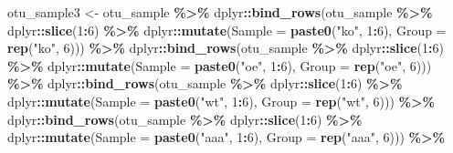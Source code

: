 \documentclass[
]{book}
\newenvironment{Shaded}{\begin{snugshade}}{\end{snugshade}}
\newcommand{\AttributeTok}[1]{\textcolor[rgb]{0.13,0.29,0.53}{#1}}
\newcommand{\DecValTok}[1]{\textcolor[rgb]{0.00,0.00,0.81}{#1}}
\newcommand{\FunctionTok}[1]{\textcolor[rgb]{0.13,0.29,0.53}{\textbf{#1}}}
\newcommand{\NormalTok}[1]{#1}
\newcommand{\OtherTok}[1]{\textcolor[rgb]{0.56,0.35,0.01}{#1}}
\newcommand{\SpecialCharTok}[1]{\textcolor[rgb]{0.81,0.36,0.00}{\textbf{#1}}}
\newcommand{\StringTok}[1]{\textcolor[rgb]{0.31,0.60,0.02}{#1}}
\begin{document}
\begin{Shaded}
\begin{Highlighting}[]
\NormalTok{otu\_sample3 }\OtherTok{\textless{}{-}}\NormalTok{ otu\_sample }\SpecialCharTok{\%\textgreater{}\%}
\NormalTok{  dplyr}\SpecialCharTok{::}\FunctionTok{bind\_rows}\NormalTok{(otu\_sample }\SpecialCharTok{\%\textgreater{}\%}\NormalTok{ dplyr}\SpecialCharTok{::}\FunctionTok{slice}\NormalTok{(}\DecValTok{1}\SpecialCharTok{:}\DecValTok{6}\NormalTok{) }\SpecialCharTok{\%\textgreater{}\%}
\NormalTok{                     dplyr}\SpecialCharTok{::}\FunctionTok{mutate}\NormalTok{(}\AttributeTok{Sample =} \FunctionTok{paste0}\NormalTok{(}\StringTok{"ko"}\NormalTok{,  }\DecValTok{1}\SpecialCharTok{:}\DecValTok{6}\NormalTok{), }\AttributeTok{Group =} \FunctionTok{rep}\NormalTok{(}\StringTok{"ko"}\NormalTok{,  }\DecValTok{6}\NormalTok{))) }\SpecialCharTok{\%\textgreater{}\%}
\NormalTok{  dplyr}\SpecialCharTok{::}\FunctionTok{bind\_rows}\NormalTok{(otu\_sample }\SpecialCharTok{\%\textgreater{}\%}\NormalTok{ dplyr}\SpecialCharTok{::}\FunctionTok{slice}\NormalTok{(}\DecValTok{1}\SpecialCharTok{:}\DecValTok{6}\NormalTok{) }\SpecialCharTok{\%\textgreater{}\%}
\NormalTok{                     dplyr}\SpecialCharTok{::}\FunctionTok{mutate}\NormalTok{(}\AttributeTok{Sample =} \FunctionTok{paste0}\NormalTok{(}\StringTok{"oe"}\NormalTok{,  }\DecValTok{1}\SpecialCharTok{:}\DecValTok{6}\NormalTok{), }\AttributeTok{Group =} \FunctionTok{rep}\NormalTok{(}\StringTok{"oe"}\NormalTok{,  }\DecValTok{6}\NormalTok{))) }\SpecialCharTok{\%\textgreater{}\%}
\NormalTok{  dplyr}\SpecialCharTok{::}\FunctionTok{bind\_rows}\NormalTok{(otu\_sample }\SpecialCharTok{\%\textgreater{}\%}\NormalTok{ dplyr}\SpecialCharTok{::}\FunctionTok{slice}\NormalTok{(}\DecValTok{1}\SpecialCharTok{:}\DecValTok{6}\NormalTok{) }\SpecialCharTok{\%\textgreater{}\%}
\NormalTok{                     dplyr}\SpecialCharTok{::}\FunctionTok{mutate}\NormalTok{(}\AttributeTok{Sample =} \FunctionTok{paste0}\NormalTok{(}\StringTok{"wt"}\NormalTok{,  }\DecValTok{1}\SpecialCharTok{:}\DecValTok{6}\NormalTok{), }\AttributeTok{Group =} \FunctionTok{rep}\NormalTok{(}\StringTok{"wt"}\NormalTok{,  }\DecValTok{6}\NormalTok{))) }\SpecialCharTok{\%\textgreater{}\%}
\NormalTok{  dplyr}\SpecialCharTok{::}\FunctionTok{bind\_rows}\NormalTok{(otu\_sample }\SpecialCharTok{\%\textgreater{}\%}\NormalTok{ dplyr}\SpecialCharTok{::}\FunctionTok{slice}\NormalTok{(}\DecValTok{1}\SpecialCharTok{:}\DecValTok{6}\NormalTok{) }\SpecialCharTok{\%\textgreater{}\%}
\NormalTok{                     dplyr}\SpecialCharTok{::}\FunctionTok{mutate}\NormalTok{(}\AttributeTok{Sample =} \FunctionTok{paste0}\NormalTok{(}\StringTok{"aaa"}\NormalTok{, }\DecValTok{1}\SpecialCharTok{:}\DecValTok{6}\NormalTok{), }\AttributeTok{Group =} \FunctionTok{rep}\NormalTok{(}\StringTok{"aaa"}\NormalTok{, }\DecValTok{6}\NormalTok{))) }\SpecialCharTok{\%\textgreater{}\%}

\end{Highlighting}
\end{Shaded}
\end{document}
